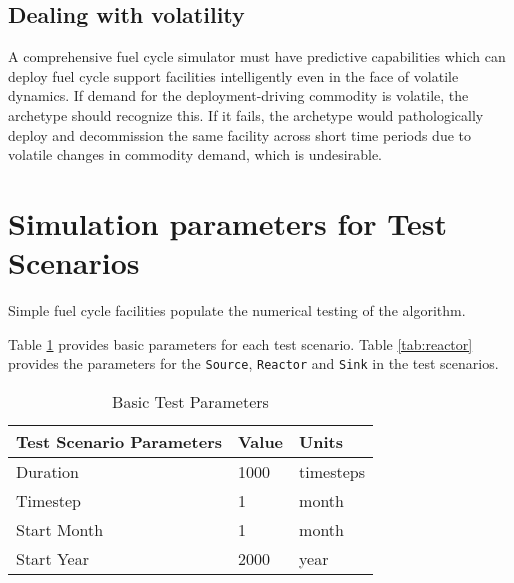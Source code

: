 \documentclass[11pt,letterpaper]{article}
\begin{document}
 \subsection{Dealing with volatility}
 \label{subsection-volatile}
A comprehensive fuel cycle simulator must have predictive capabilities which 
can deploy fuel cycle support facilities intelligently even in the face of 
volatile dynamics. If demand for the deployment-driving commodity is volatile, 
the archetype should recognize this. If it fails, the archetype would pathologically
deploy and decommission the same facility across short time periods due to volatile changes in commodity demand,
which is undesirable. 

\section{Simulation parameters for Test Scenarios}
Simple fuel cycle facilities populate the numerical testing of the algorithm.   

Table \ref{tab:testscenario} provides basic parameters for each test scenario. Table \ref{tab:reactor} provides the parameters for the \texttt{Source}, \texttt{Reactor} and \texttt{Sink} in the test scenarios.

\begin{table}[H]
	\centering
	\caption {Basic Test Parameters}
	\label{tab:testscenario}
	\begin{tabular}{|l|l|l|}
		\hline
		\textbf{Test Scenario Parameters} & \textbf{Value} & \textbf{Units} \\
		\hline
		Duration & 1000 & timesteps \\
		Timestep & 1 & month \\
		Start Month & 1 & month \\
		Start Year & 2000 & year \\
		\hline
	\end{tabular}
\end{table}
\end{document}
